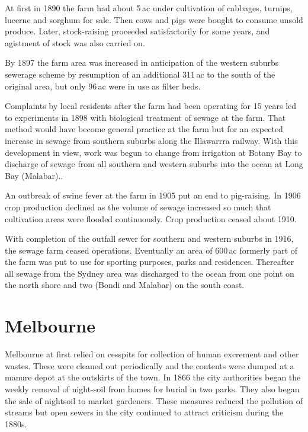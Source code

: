 At first in 1890 the farm had about 5\,ac under cultivation of
cabbages, turnips, lucerne and sorghum for sale.  Then cows and pigs
were bought to consume unsold produce.  Later, stock-raising proceeded
satisfactorily for some years, and agistment of stock was also carried
on.

By 1897 the farm area was increased in anticipation of the western
suburbs sewerage scheme by resumption of an additional 311\,ac to the
south of the original area, but only 96\,ac were in use as filter
beds.

Complaints by local residents after the farm had been operating for 15
years led to experiments in 1898 with biological treatment of sewage
at the farm.  That method would have become general practice at the
farm but for an expected increase in sewage from southern suburbs
along the Illawarrra railway.  With this development in view, work was
begun to change from irrigation at Botany Bay to discharge of sewage
from all southern and western suburbs into the ocean at Long Bay
(Malabar)..

An outbreak of swine fever at the farm in 1905 put an end to
pig-raising.  In 1906 crop production declined as the volume of sewage
increased so much that cultivation areas were flooded continuously.
Crop production ceased about 1910.

With completion of the outfall sewer for southern and western suburbs
in 1916, the sewage farm ceased operations.  Eventually an area of
600\,ac formerly part of the farm was put to use for sporting
purposes, parks and residences.  Thereafter all sewage from the Sydney
area was discharged to the ocean from one point on the north shore and
two (Bondi and Malabar) on the south coast.

\section*{Melbourne}

Melbourne at first relied on cesspits for collection of human
excrement and other wastes.  These were cleaned out periodically and
the contents were dumped at a manure depot at the outskirts of the
town.  In 1866 the city authorities began the weekly removal of
night-soil from homes for burial in two parks.  They also began the
sale of nightsoil to market gardeners.  These measures
reduced the pollution of streams but open sewers in the city continued
to attract criticism during the 1880s.

